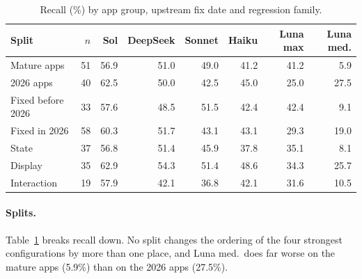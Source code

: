 \documentclass[sigconf]{acmart}
\begin{document}
\begin{table}[t]
  \caption{Recall (\%) by app group, upstream fix date and regression family.}
  \label{tab:splits}
  \footnotesize\setlength{\tabcolsep}{2.6pt}
  \begin{tabular}{@{}lrrrrrrr@{}}
    \toprule
    Split & $n$ & Sol & DeepSeek & Sonnet & Haiku & Luna max & Luna med. \\
    \midrule
    Mature apps & 51 & 56.9 & 51.0 & 49.0 & 41.2 & 41.2 & 5.9 \\
    2026 apps & 40 & 62.5 & 50.0 & 42.5 & 45.0 & 25.0 & 27.5 \\
    \midrule
    Fixed before 2026 & 33 & 57.6 & 48.5 & 51.5 & 42.4 & 42.4 & 9.1 \\
    Fixed in 2026 & 58 & 60.3 & 51.7 & 43.1 & 43.1 & 29.3 & 19.0 \\
    \midrule
    State & 37 & 56.8 & 51.4 & 45.9 & 37.8 & 35.1 & 8.1 \\
    Display & 35 & 62.9 & 54.3 & 51.4 & 48.6 & 34.3 & 25.7 \\
    Interaction & 19 & 57.9 & 42.1 & 36.8 & 42.1 & 31.6 & 10.5 \\
    \bottomrule
  \end{tabular}
\end{table}

\paragraph{Splits.}
Table~\ref{tab:splits} breaks recall down. No split changes the ordering of the four strongest
configurations by more than one place, and Luna med.\ does far worse on the mature apps (5.9\%) than
on the 2026 apps (27.5\%).
\end{document}
